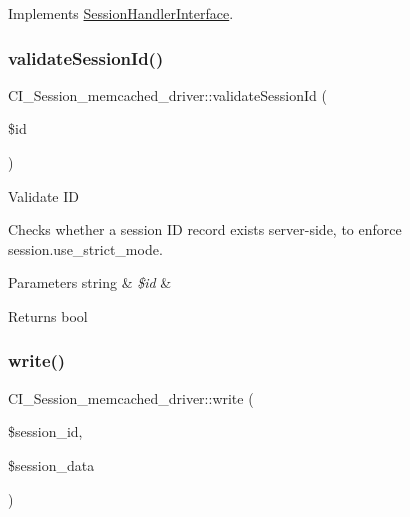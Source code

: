 Implements \mbox{\hyperlink{interface_session_handler_interface}{Session\+Handler\+Interface}}.

\mbox{\label{class_c_i___session__memcached__driver_a52cdd6ca28cd5ed1eb0c8e7b1eee4af6}} 
\subsubsection{\texorpdfstring{validate\+Session\+Id()}{validateSessionId()}}
{\footnotesize\ttfamily C\+I\+\_\+\+Session\+\_\+memcached\+\_\+driver\+::validate\+Session\+Id (\begin{DoxyParamCaption}\item[{}]{\$id }\end{DoxyParamCaption})}

Validate ID

Checks whether a session ID record exists server-\/side, to enforce session.\+use\+\_\+strict\+\_\+mode.


\begin{DoxyParams}[1]{Parameters}
string & {\em \$id} & \\
\hline
\end{DoxyParams}
\begin{DoxyReturn}{Returns}
bool 
\end{DoxyReturn}
\mbox{\label{class_c_i___session__memcached__driver_a40d08f4aadd7856aae82bbc04e400962}} 
\subsubsection{\texorpdfstring{write()}{write()}}
{\footnotesize\ttfamily C\+I\+\_\+\+Session\+\_\+memcached\+\_\+driver\+::write (\begin{DoxyParamCaption}\item[{}]{\$session\+\_\+id,  }\item[{}]{\$session\+\_\+data }\end{DoxyParamCaption})}

